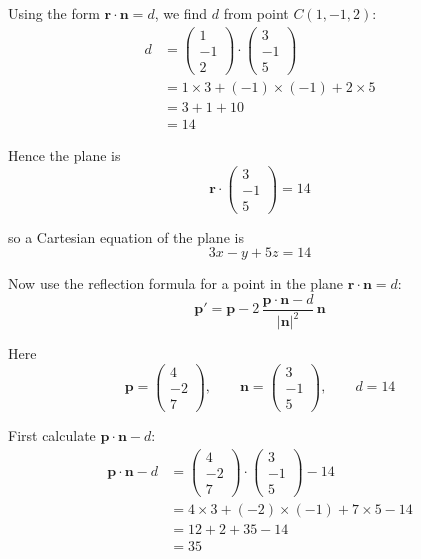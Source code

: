 \documentclass[leqno]{article}
\begin{document}
\begin{enumerate}[
  label=\textbf{\arabic*.},
  leftmargin=*,
  topsep=0pt,
  partopsep=0pt,
  parsep=0pt
]
\begin{djsSolution}
Using the form \(\mathbf r\cdot\mathbf n=d\), we find \(d\) from point \(C(1,-1,2)\):
\begin{align*}
d&=\begin{pmatrix}1\\-1\\2\end{pmatrix}\cdot\begin{pmatrix}3\\-1\\5\end{pmatrix}\\
&=1\times 3+(-1)\times(-1)+2\times 5\\
&=3+1+10\\
&=14
\end{align*}

Hence the plane is
\[
\mathbf r\cdot\begin{pmatrix}3\\-1\\5\end{pmatrix}=14
\]

so a Cartesian equation of the plane is
\[
3x-y+5z=14
\]

Now use the reflection formula for a point in the plane \(\mathbf r\cdot\mathbf n=d\):
\[
\mathbf p'
=\mathbf p
-2\,\dfrac{\mathbf p\cdot\mathbf n-d}{|\mathbf n|^2}\,\mathbf n
\]

Here
\[
\mathbf p=\begin{pmatrix}4\\-2\\7\end{pmatrix},\qquad \mathbf n=\begin{pmatrix}3\\-1\\5\end{pmatrix},\qquad d=14
\]

First calculate \(\mathbf p\cdot\mathbf n-d\):
\begin{align*}
\mathbf p\cdot\mathbf n-d
&=\begin{pmatrix}4\\-2\\7\end{pmatrix}\cdot\begin{pmatrix}3\\-1\\5\end{pmatrix}-14\\
&=4\times 3+(-2)\times(-1)+7\times 5-14\\
&=12+2+35-14\\
&=35
\end{align*}


\end{djsSolution}
\end{enumerate}
\end{document}
